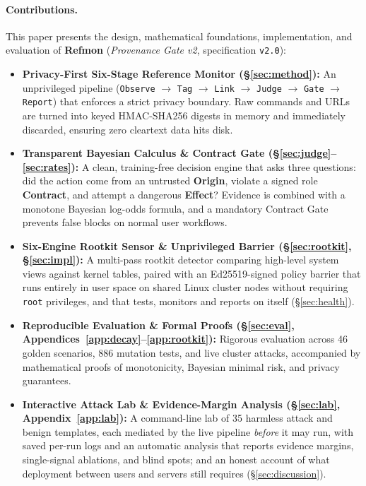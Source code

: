 \documentclass[10pt,twocolumn,letterpaper]{article}
\makeatletter
\theoremstyle{plain}
\theoremstyle{definition}
\theoremstyle{remark}
\DeclareRobustCommand{\_}{\ifmmode\nfss@text{\textunderscore}\else\textunderscore\penalty\@highpenalty\hskip\z@skip\fi}
\makeatother
\begin{document}
\paragraph{Contributions.} This paper presents the design, mathematical foundations, implementation, and evaluation of \textbf{Refmon} (\emph{Provenance Gate v2}, specification \texttt{v2.0}):
\begin{itemize}[leftmargin=1.3em,itemsep=1.5pt,topsep=2pt]
  \item \textbf{Privacy-First Six-Stage Reference Monitor (\S\ref{sec:method}):} An unprivileged pipeline (\texttt{Observe} $\to$ \texttt{Tag} $\to$ \texttt{Link} $\to$ \texttt{Judge} $\to$ \texttt{Gate} $\to$ \texttt{Report}) that enforces a strict privacy boundary. Raw commands and URLs are turned into keyed HMAC-SHA256 digests in memory and immediately discarded, ensuring zero cleartext data hits disk.
  \item \textbf{Transparent Bayesian Calculus \& Contract Gate (\S\ref{sec:judge}--\ref{sec:rates}):} A clean, training-free decision engine that asks three questions: did the action come from an untrusted \textbf{Origin}, violate a signed role \textbf{Contract}, and attempt a dangerous \textbf{Effect}? Evidence is combined with a monotone Bayesian log-odds formula, and a mandatory Contract Gate prevents false blocks on normal user workflows.
  \item \textbf{Six-Engine Rootkit Sensor \& Unprivileged Barrier (\S\ref{sec:rootkit}, \S\ref{sec:impl}):} A multi-pass rootkit detector comparing high-level system views against kernel tables, paired with an Ed25519-signed policy barrier that runs entirely in user space on shared Linux cluster nodes without requiring \texttt{root} privileges, and that tests, monitors and reports on itself (\S\ref{sec:health}).
  \item \textbf{Reproducible Evaluation \& Formal Proofs (\S\ref{sec:eval}, Appendices~\ref{app:decay}--\ref{app:rootkit}):} Rigorous evaluation across 46 golden scenarios, 886 mutation tests, and live cluster attacks, accompanied by mathematical proofs of monotonicity, Bayesian minimal risk, and privacy guarantees.
  \item \textbf{Interactive Attack Lab \& Evidence-Margin Analysis (\S\ref{sec:lab}, Appendix~\ref{app:lab}):} A command-line lab of 35 harmless attack and benign templates, each mediated by the live pipeline \emph{before} it may run, with saved per-run logs and an automatic analysis that reports evidence margins, single-signal ablations, and blind spots; and an honest account of what deployment between users and servers still requires (\S\ref{sec:discussion}).
\end{itemize}
\end{document}
